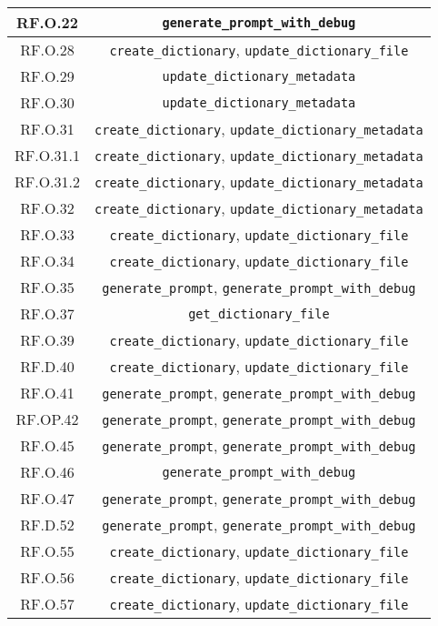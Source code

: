 \begin{adjustwidth}{-0.5cm}{-0.5cm}
\begin{longtable}{|c|c|}
    \hline RF.O.22 & \texttt{generate\_prompt\_with\_debug} \\
    \hline RF.O.28 & \texttt{create\_dictionary}, \texttt{update\_dictionary\_file} \\
    \hline RF.O.29 & \texttt{update\_dictionary\_metadata} \\
    \hline RF.O.30 & \texttt{update\_dictionary\_metadata} \\
    \hline RF.O.31 & \texttt{create\_dictionary}, \texttt{update\_dictionary\_metadata} \\
    \hline RF.O.31.1 & \texttt{create\_dictionary}, \texttt{update\_dictionary\_metadata} \\
    \hline RF.O.31.2 & \texttt{create\_dictionary}, \texttt{update\_dictionary\_metadata} \\
    \hline RF.O.32 & \texttt{create\_dictionary}, \texttt{update\_dictionary\_metadata} \\
    \hline RF.O.33 & \texttt{create\_dictionary}, \texttt{update\_dictionary\_file} \\
    \hline RF.O.34 & \texttt{create\_dictionary}, \texttt{update\_dictionary\_file} \\
    \hline RF.O.35 & \texttt{generate\_prompt}, \texttt{generate\_prompt\_with\_debug} \\
    \hline RF.O.37 & \texttt{get\_dictionary\_file} \\
    \hline RF.O.39 & \texttt{create\_dictionary}, \texttt{update\_dictionary\_file} \\
    \hline RF.D.40 & \texttt{create\_dictionary}, \texttt{update\_dictionary\_file} \\
    \hline RF.O.41 & \texttt{generate\_prompt}, \texttt{generate\_prompt\_with\_debug} \\
    \hline RF.OP.42 & \texttt{generate\_prompt}, \texttt{generate\_prompt\_with\_debug} \\
    \hline RF.O.45 & \texttt{generate\_prompt}, \texttt{generate\_prompt\_with\_debug} \\
    \hline RF.O.46 & \texttt{generate\_prompt\_with\_debug} \\
    \hline RF.O.47 & \texttt{generate\_prompt}, \texttt{generate\_prompt\_with\_debug} \\
    \hline RF.D.52 & \texttt{generate\_prompt}, \texttt{generate\_prompt\_with\_debug} \\
    \hline RF.O.55 & \texttt{create\_dictionary}, \texttt{update\_dictionary\_file} \\
    \hline RF.O.56 & \texttt{create\_dictionary}, \texttt{update\_dictionary\_file} \\
    \hline RF.O.57 & \texttt{create\_dictionary}, \texttt{update\_dictionary\_file} \\
  \end{longtable}
\end{adjustwidth}
\egroup
